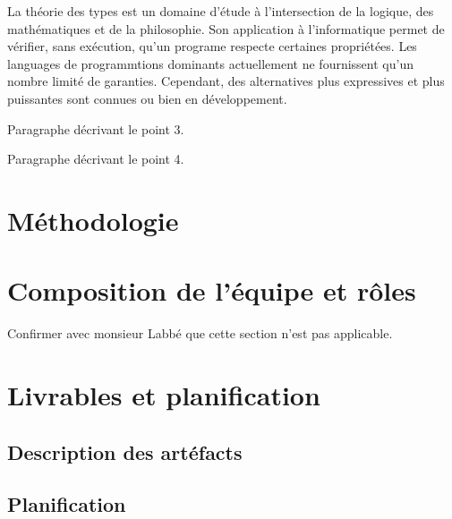 \documentclass[letterpaper
, twoside
, 12pt
,these
,francais
,creativecommons,hyperref
]{thETS}
\begin{document}
La théorie des types est un domaine d'étude à l'intersection de la logique, des mathématiques et de
la philosophie. Son application à l'informatique permet de vérifier, sans exécution, qu'un programe
respecte certaines propriétées. Les languages de programmtions dominants actuellement ne fournissent
qu'un nombre limité de garanties. Cependant, des alternatives plus expressives et plus puissantes
sont connues ou bien en développement.

Paragraphe décrivant le point 3.

Paragraphe décrivant le point 4.

\chapter{Méthodologie}

%


\chapter{Composition de l'équipe et rôles}

Confirmer avec monsieur Labbé que cette section n'est pas applicable.

\chapter{Livrables et planification}

\section{Description des artéfacts}


\section{Planification}
\end{document}
